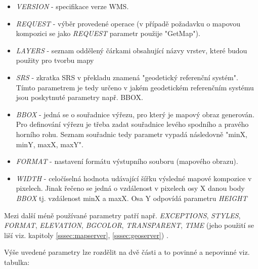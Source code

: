 \begin{itemize}
\item\textit{VERSION} - specifikace verze WMS.
	
\item\textit{REQUEST} - výběr provedené operace (v případě požadavku o
  mapovou kompozici se jako \textit{REQUEST} parametr použije "GetMap").

\item\textit{LAYERS} - seznam oddělený čárkami obsahující názvy vrstev,
  které budou použity pro tvorbu mapy
	
\item\textit{SRS} - zkratka SRS v překladu znamená "geodetický
  referenční systém". Tímto parametrem je tedy určeno v jakém
  geodetickém referenčním systému jsou poskytnuté parametry
  např. BBOX.

\item\textit{BBOX} - jedná se o souřadnice výřezu, pro který je mapový obraz generován. Pro definování výřezu je třeba zadat
  souřadnice levého spodního a pravého horního rohu. Seznam souřadnic
  tedy parametr vypadá následovně "minX, minY, maxX, maxY".
	
\item\textit{FORMAT} - nastavení formátu výstupního souboru (mapového
  obrazu).
	
\item\textit{WIDTH} - celočíselná hodnota udávající šířku výsledné
  mapové kompozice v pixelech. Jinak řečeno se jedná o vzdálenost v pixelech 
  osy X danou body \textit{BBOX} tj. vzdálenost minX a maxX. Osa Y odpovídá parametru \textit{HEIGHT}

\end{itemize}

Mezi další méně používané parametry patří např. \textit{EXCEPTIONS}, \textit{STYLES}, \textit{FORMAT}, \textit{ELEVATION}, \textit{BGCOLOR}, \textit{TRANSPARENT}, \textit{TIME} (jeho použití se liší viz. kapitoly \ref{sssec:mapserver}, \ref{sssec:geoserver}) \cite{oqc_wms}.

Výše uvedené parametry lze rozdělit na dvě části a to povinné a
nepovinné viz. tabulka:

